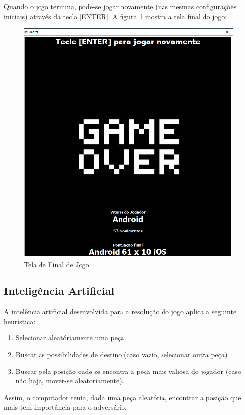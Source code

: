 	Quando o jogo termina, pode-se jogar novamente (nas mesmas configurações iniciais) através da tecla [ENTER]. A figura \ref{fig3}
	mostra a tela final do jogo:
	\begin{figure}[h]
		\centering
		\includegraphics[scale = 0.5]{final.png}
		\caption{Tela de Final de Jogo}
		\label{fig3}
	\end{figure}


	\subsection{Inteligência Artificial}

	A intelência artificial desenvolvida para a resolução do jogo aplica a seguinte heurística:
	\begin{enumerate}
			\item Selecionar aleatóriamente uma peça
			\item Buscar as possibilidades de destino (caso vazio, selecionar outra peça)
			\item Buscar pela posição onde se encontra a peça mais valiosa do jogador (caso não haja, mover-se aleatoriamente).
	\end{enumerate}

	Assim, o computador tenta, dada uma peça aleatória, encontrar a posição que mais tem importância para o adversário.

